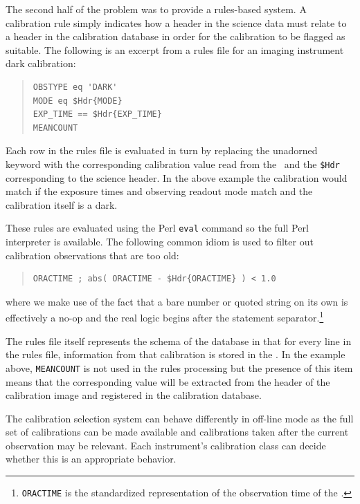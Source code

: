 \documentclass[final,authoryear,5p,times,twocolumn]{elsarticle}
\begin{document}
The second half of the problem was to provide a rules-based system.
A calibration rule simply indicates how a header in the science data
must relate to a header in the calibration database in order for the
calibration to be flagged as suitable. The following is an excerpt
from a rules file for an imaging instrument dark calibration:

\begin{quote}
{\small
\begin{verbatim}
OBSTYPE eq 'DARK'
MODE eq $Hdr{MODE}
EXP_TIME == $Hdr{EXP_TIME}
MEANCOUNT
\end{verbatim}
}
\end{quote}

Each row in the rules file is evaluated in turn by replacing the
unadorned keyword with the corresponding calibration value read from
the \Index\ and the \texttt{\$Hdr} corresponding to the science
header. In the above example the
calibration would match if the exposure times and observing readout
mode match and the calibration itself is a dark.

These rules are evaluated using the Perl \texttt{eval} command
so the full Perl interpreter is available. The following common idiom
is used to filter out calibration observations that are too old:

\begin{quote}
{\small
\begin{verbatim}
ORACTIME ; abs( ORACTIME - $Hdr{ORACTIME} ) < 1.0
\end{verbatim}
}
\end{quote}

where we make use of the fact that a bare number or quoted string on
its own is effectively a no-op and the real logic begins after the
statement separator.\footnote{\texttt{ORACTIME} is the standardized
representation of the observation time of the \Frame.}

The rules file itself represents the schema of the database in
that for every line in the rules file, information from that
calibration is stored in the \Index. In the example above,
\texttt{MEANCOUNT} is not used in the rules processing but the
presence of this item means that the corresponding value will be
extracted from the header of the calibration image and registered in
the calibration database.

The calibration selection system can behave differently in off-line
mode as the full set of calibrations can be made available and
calibrations taken after the current observation may be relevant. Each
instrument's calibration class can decide whether this is an
appropriate behavior.
\end{document}
